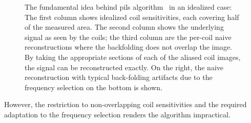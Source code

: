\begin{figure}
	\caption[The idea behind parallel imaging illustrated by an idealized example]{%
		The fundamental idea behind \gls{pils} algorithm~\cite{griswold_partially_2000} in an idealized case:
		The first column shows idealized coil sensitivities, each covering half of the measured area.
		The second column shows the underlying signal as seen by the coils; the third column are the per-coil naive reconstructions where the backfolding does not overlap the image.
		By taking the appropriate sections of each of the aliased coil images, the signal can be reconstructed exactly.
		On the right, the naive reconstruction with typical back-folding artifacts due to the frequency selection on the bottom is shown.
	}%
	\label{fig:pils}
\end{figure}
However, the restriction to non-overlapping coil sensitivities and the required adaptation to the frequency selection renders the algorithm impractical.

